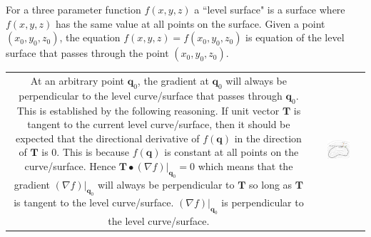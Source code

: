 \documentclass{article}
\begin{document}
For a three parameter function \(f(x, y, z)\) a ``level surface" is a surface where \(f(x, y, z)\) has the same value at all points on the surface. Given a point \((x_0, y_0, z_0)\), the equation \(f(x, y, z) = f(x_0, y_0, z_0)\) is equation of the level surface that passes through the point \((x_0, y_0, z_0)\). 

\begin{tabular}{cc}
\parbox{0.5\textwidth}{
At an arbitrary point \(\mathbf{q}_0\), the gradient at \(\mathbf{q}_0\) will always be perpendicular to the level curve/surface that passes through \(\mathbf{q}_0\). This is established by the following reasoning. If unit vector \(\mathbf{T}\) is tangent to the current level curve/surface, then it should be expected that the directional derivative of \(f(\mathbf{q})\) in the direction of \(\mathbf{T}\) is \(0\). This is because \(f(\mathbf{q})\) is constant at all points on the curve/surface. Hence \(\mathbf{T} \bullet (\nabla f)\Big|_{\mathbf{q}_0} = 0\) which means that the gradient \((\nabla f)\Big|_{\mathbf{q}_0}\) will always be perpendicular to \(\mathbf{T}\) so long as \(\mathbf{T}\) is tangent to the level curve/surface. \((\nabla f)\Big|_{\mathbf{q}_0}\) is perpendicular to the level curve/surface.
} & \parbox{0.5\textwidth}{
\includegraphics[width = 0.5\textwidth]{level_curves}
}
\end{tabular}
\end{document}
